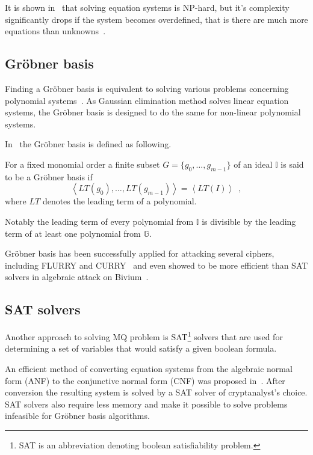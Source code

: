It is shown in~\cite{Courtois:MQ-NPhard} that solving equation systems is
NP-hard, but it's complexity significantly drops if the system becomes
overdefined, that is there are much more equations than
unknowns~\cite{DBLP:conf/asiacrypt/CourtoisP02}.

\subsection{Gr\"obner basis}

Finding a Gr\"obner basis is equivalent to solving various problems concerning
polynomial systems~\cite{bard2009algebraic}. As Gaussian elimination method
solves linear equation systems, the Gr\"obner basis is designed to do the same
for non-linear polynomial systems.

In~\cite{Albrecht2006} the Gr\"obner basis is defined as following.

    For a fixed monomial order a finite subset $G = \{g_0, \hdots, g_{m-1}\}$
    of an ideal $\mathbb{I}$ is said to be a Gr\"obner basis if
    \begin{equation}
    \label{eqn:groebner}
    \left< LT(g_0), \hdots, LT(g_{m-1}) \right> = \left< LT(I) \right> \enspace,
    \end{equation}
    where $LT$ denotes the leading term of a polynomial.

Notably the leading term of every polynomial from $\mathbb{I}$ is divisible by
the leading term of at least one polynomial from $\mathbb{G}$.

Gr\"obner basis has been successfully applied for attacking several ciphers,
including FLURRY and CURRY~\cite{Pyshkin2008:groebner} and even showed to be
more efficient than SAT solvers in algebraic attack on
Bivium~\cite{springerlink:10.1007/s11786-009-0016-7}.

\subsection{SAT solvers}

Another approach to solving MQ problem is SAT\footnote{SAT is an abbreviation
denoting boolean satisfiability problem.} solvers that are used for
determining a set of variables that would satisfy a given boolean formula. 

An efficient method of converting equation systems from the algebraic normal
form (ANF) to the conjunctive normal form (CNF) was proposed
in~\cite{cryptoeprint:2007:024}. After conversion the resulting system is
solved by a SAT solver of cryptanalyst's choice. SAT solvers also require less
memory and make it possible to solve problems infeasible for Gr\"obner basis
algorithms.

